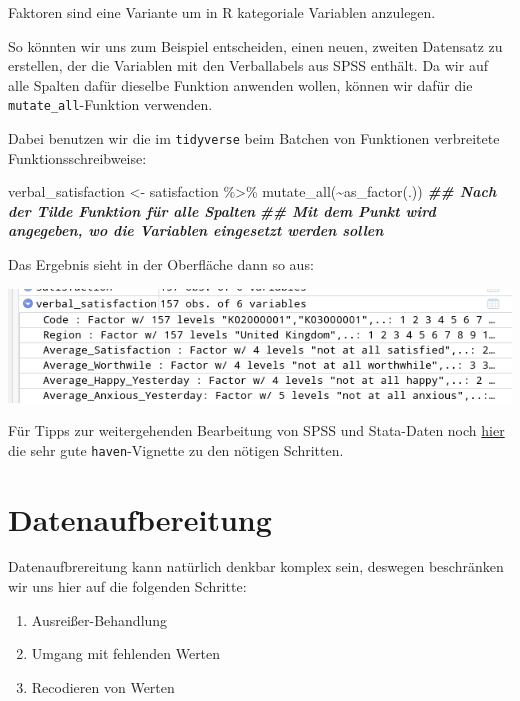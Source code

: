 \documentclass[
]{book}
\newenvironment{Shaded}{\begin{snugshade}}{\end{snugshade}}
\newcommand{\DocumentationTok}[1]{\textcolor[rgb]{0.56,0.35,0.01}{\textbf{\textit{#1}}}}
\newcommand{\FunctionTok}[1]{\textcolor[rgb]{0.00,0.00,0.00}{#1}}
\newcommand{\NormalTok}[1]{#1}
\newcommand{\OtherTok}[1]{\textcolor[rgb]{0.56,0.35,0.01}{#1}}
\newcommand{\SpecialCharTok}[1]{\textcolor[rgb]{0.00,0.00,0.00}{#1}}
\begin{document}
Faktoren sind eine Variante um in R kategoriale Variablen anzulegen.

So könnten wir uns zum Beispiel entscheiden, einen neuen, zweiten Datensatz zu erstellen, der die Variablen mit den Verballabels aus SPSS enthält.
Da wir auf alle Spalten dafür dieselbe Funktion anwenden wollen, können wir dafür die \texttt{mutate\_all}-Funktion verwenden.

Dabei benutzen wir die im \texttt{tidyverse} beim Batchen von Funktionen verbreitete Funktionsschreibweise:

\begin{Shaded}
\begin{Highlighting}[]
\NormalTok{verbal\_satisfaction }\OtherTok{\textless{}{-}}\NormalTok{ satisfaction }\SpecialCharTok{\%\textgreater{}\%} 
  \FunctionTok{mutate\_all}\NormalTok{(}\SpecialCharTok{\textasciitilde{}}\FunctionTok{as\_factor}\NormalTok{(.)) }\DocumentationTok{\#\# Nach der Tilde Funktion für alle Spalten}
\DocumentationTok{\#\# Mit dem Punkt wird angegeben, wo die Variablen eingesetzt werden sollen}
\end{Highlighting}
\end{Shaded}

Das Ergebnis sieht in der Oberfläche dann so aus:

\begin{center}\includegraphics[width=0.8\linewidth]{imgs/spss2} \end{center}

Für Tipps zur weitergehenden Bearbeitung von SPSS und Stata-Daten noch \href{https://www.rdocumentation.org/packages/haven/versions/2.2.0/vignettes/semantics.Rmd}{hier} die sehr gute \texttt{haven}-Vignette zu den nötigen Schritten.

\hypertarget{datenaufbereitung}{%
\section{Datenaufbereitung}\label{datenaufbereitung}}

Datenaufbrereitung kann natürlich denkbar komplex sein, deswegen beschränken wir uns hier auf die folgenden Schritte:

\begin{enumerate}
\def\labelenumi{\arabic{enumi}.}
\item
  Ausreißer-Behandlung
\item
  Umgang mit fehlenden Werten
\item
  Recodieren von Werten
\end{enumerate}
\end{document}

